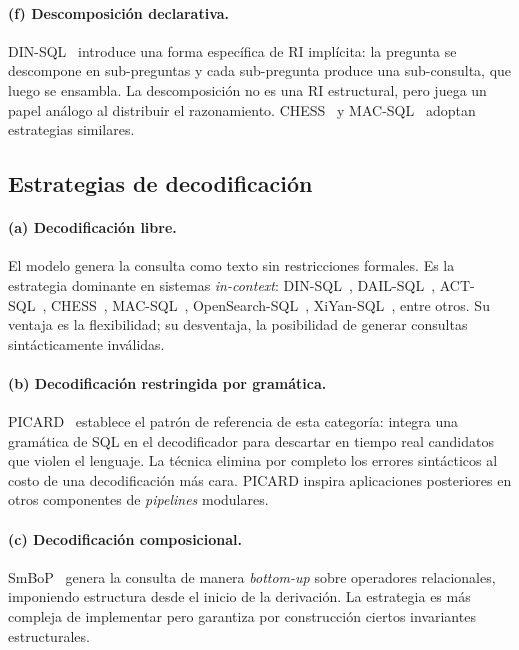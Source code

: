 \paragraph{(f) Descomposición declarativa.}
DIN-SQL~\cite{DIN-SQL2023} introduce una forma específica de RI
implícita: la pregunta se descompone en sub-preguntas y cada
sub-pregunta produce una sub-consulta, que luego se ensambla. La
descomposición no es una RI estructural, pero juega un papel análogo al
distribuir el razonamiento. CHESS~\cite{CHESS2024} y
MAC-SQL~\cite{MAC-SQL2023} adoptan estrategias similares.

\subsection{Estrategias de decodificación}
\label{subsec:sota-d3c-decoding}

\paragraph{(a) Decodificación libre.} El modelo genera la consulta como
texto sin restricciones formales. Es la estrategia dominante en sistemas
\emph{in-context}: DIN-SQL~\cite{DIN-SQL2023}, DAIL-SQL~\cite{DAIL-SQL2023},
ACT-SQL~\cite{ACT-SQL2023}, CHESS~\cite{CHESS2024},
MAC-SQL~\cite{MAC-SQL2023}, OpenSearch-SQL~\cite{OpenSearch-SQL2025},
XiYan-SQL~\cite{XiYan-SQL2024}, entre otros. Su ventaja es la
flexibilidad; su desventaja, la posibilidad de generar consultas
sintácticamente inválidas.

\paragraph{(b) Decodificación restringida por gramática.}
PICARD~\cite{PICARD2022} establece el patrón de referencia de esta
categoría: integra una gramática de SQL en el decodificador para
descartar en tiempo real candidatos que violen el lenguaje. La técnica
elimina por completo los errores sintácticos al costo de una
decodificación más cara. PICARD inspira aplicaciones posteriores en
otros componentes de \emph{pipelines} modulares.

\paragraph{(c) Decodificación composicional.} SmBoP~\cite{SmBoP2021}
genera la consulta de manera \emph{bottom-up} sobre operadores
relacionales, imponiendo estructura desde el inicio de la derivación.
La estrategia es más compleja de implementar pero garantiza por
construcción ciertos invariantes estructurales.

